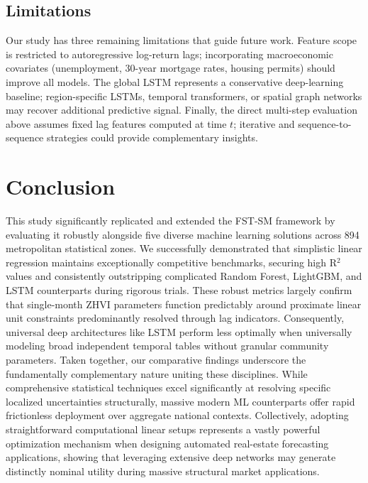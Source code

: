 \documentclass[runningheads]{llncs}
\begin{document}
\subsection{Limitations}
\label{sec:limitations}

Our study has three remaining limitations that guide future work. Feature scope is restricted to autoregressive log-return lags; incorporating macroeconomic covariates (unemployment, 30-year mortgage rates, housing permits) should improve all models. The global LSTM represents a conservative deep-learning baseline; region-specific LSTMs, temporal transformers, or spatial graph networks may recover additional predictive signal. Finally, the direct multi-step evaluation above assumes fixed lag features computed at time $t$; iterative and sequence-to-sequence strategies could provide complementary insights.

\section{Conclusion}
\label{sec:conclusion}

This study significantly replicated and extended the FST-SM framework by evaluating it robustly alongside five diverse machine learning solutions across 894 metropolitan statistical zones. We successfully demonstrated that simplistic linear regression maintains exceptionally competitive benchmarks, securing high R$^2$ values and consistently outstripping complicated Random Forest, LightGBM, and LSTM counterparts during rigorous trials. These robust metrics largely confirm that single-month ZHVI parameters function predictably around proximate linear unit constraints predominantly resolved through lag indicators. Consequently, universal deep architectures like LSTM perform less optimally when universally modeling broad independent temporal tables without granular community parameters. Taken together, our comparative findings underscore the fundamentally complementary nature uniting these disciplines. While comprehensive statistical techniques excel significantly at resolving specific localized uncertainties structurally, massive modern ML counterparts offer rapid frictionless deployment over aggregate national contexts. Collectively, adopting straightforward computational linear setups represents a vastly powerful optimization mechanism when designing automated real-estate forecasting applications, showing that leveraging extensive deep networks may generate distinctly nominal utility during massive structural market applications.
\end{document}
